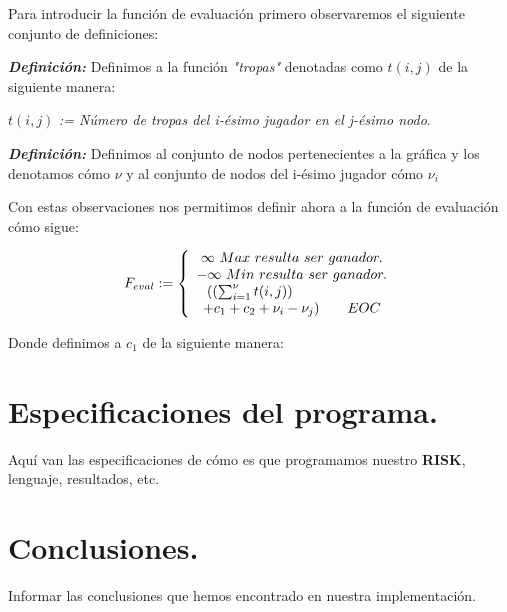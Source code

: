 \documentclass[12pt,twocolumn,draft]{article}
\begin{document}
Para introducir la funci\'on de evaluaci\'on primero observaremos el siguiente conjunto de definiciones:

\textbf{\textit{Definici\'on:}}
Definimos a la funci\'on  \textit{"tropas"} denotadas como 
$t(i,j)$ de la siguiente manera: 
\begin{center}
$t(i,j)$ \textit{:= N\'umero de tropas del i-\'esimo  jugador en el j-\'esimo nodo}.
\end{center}

\textbf{\textit{Definici\'on:}}
Definimos al conjunto de nodos pertenecientes a la gr\'afica y los denotamos c\'omo $\nu$ y al conjunto de nodos del i-\'esimo jugador c\'omo $\nu_{i}$

Con estas observaciones nos permitimos definir ahora a la funci\'on de evaluaci\'on c\'omo sigue:

$$ 
F_{eval}:= \left\{\begin{array}{c l}
  \infty\ Max\ resulta\ ser\ ganador.\\
  -\infty\ Min\ resulta\ ser\ ganador.\\
  ((\sum_{i=1}^{\nu} t(i,j)) \qquad \qquad \qquad\\
  +c_{1}+c_{2}+\nu_{i}-\nu_{j}) \qquad EOC
\end{array}
\right.
$$

Donde definimos a $c_{1}$ de la siguiente manera:





\section{Especificaciones del programa.}
Aqu\'i van las especificaciones de c\'omo es que programamos nuestro \textbf{RISK}, lenguaje, resultados, etc.

\section{Conclusiones.}
Informar las conclusiones que hemos encontrado en nuestra implementaci\'on. \cite{2personGT}


\newpage
	
{}
\end{document}

